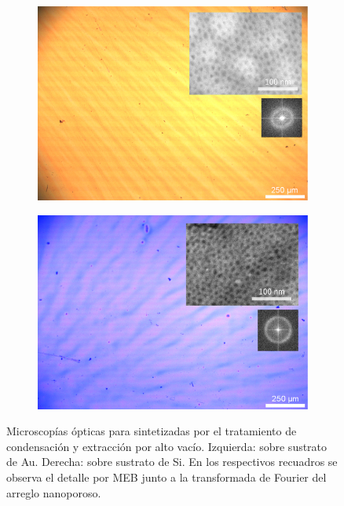 		 \begin{figure}
	 	   	    \begin{subfigure}{0.495\textwidth}
		       	\includegraphics[width=\textwidth]{Imagenes/Au_130VF127-Combinada.jpg}
		   		\end{subfigure}
		   		\begin{subfigure}{0.495\textwidth}
		   	    \includegraphics[width=\textwidth]{Imagenes/Si_130VF127-Combinada.jpg}
		   		\end{subfigure}
				 \caption[Microscopía óptica \pdmF\space tratamiento vacío.]{Microscopías ópticas para \pdmF\space sintetizadas por el tratamiento de condensación y extracción por alto vacío. Izquierda: sobre sustrato de Au. Derecha: sobre sustrato de Si. En los respectivos recuadros se observa el detalle por MEB junto a la transformada de Fourier del arreglo nanoporoso.}
				 \label{fig:Microscopia_F127_vacio}	
			     \end{figure}	

